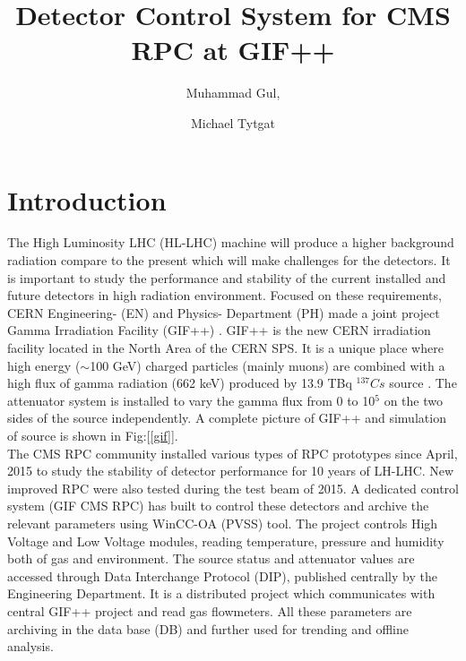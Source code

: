 \documentclass[a4paper,11pt]{article}
\title{\boldmath Detector Control System for CMS RPC at GIF++}
\author{Muhammad Gul, }
\author{Michael Tytgat}
\affiliation{Ghent University,\\Belgium}
\begin{document}
\maketitle
\flushbottom

\section{Introduction}
\label{sec:intro}
The High Luminosity LHC (HL-LHC) machine will produce a higher background radiation compare to the present which will make challenges for the detectors. It is important to study the performance and stability of the current installed and future detectors in high radiation environment. Focused on these requirements, CERN Engineering- (EN) and Physics- Department (PH) made a joint project Gamma Irradiation Facility (GIF++) \cite{gif}. GIF++ is the new CERN irradiation facility located in the North Area of the CERN SPS. It is a unique place where high energy ($\sim$100 GeV) charged particles (mainly muons) are combined with a high flux of gamma radiation (662 keV) produced by 13.9 TBq $^{137}Cs$ source \cite{atlas-gif}. The attenuator system is installed to vary the gamma flux from 0 to 10$^{5}$ on the two sides of the source independently. A complete picture of GIF++ and simulation of source is shown in Fig:[\ref{gif}].\\
The CMS RPC community installed various types of RPC prototypes since April, 2015 to study the stability of detector performance for 10 years of LH-LHC. New improved RPC were also tested during the test beam of 2015. 
A dedicated control system (GIF CMS RPC) has built to control these detectors and archive the relevant parameters using WinCC-OA (PVSS) tool. The project controls High Voltage and Low Voltage modules, reading temperature, pressure and humidity both of gas and environment. The source status and attenuator values are accessed through Data Interchange Protocol (DIP), published centrally by the Engineering Department. It is a distributed project which communicates with central GIF++ project and read gas flowmeters. All these parameters are archiving in the data base (DB) and further used for trending and offline analysis.
 
\end{document}

